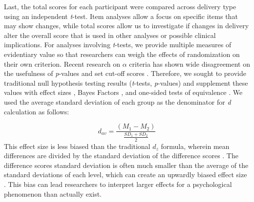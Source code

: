 \documentclass[english,man, mask]{apa6}
\theoremstyle{definition}
\theoremstyle{definition}
\theoremstyle{definition}
\theoremstyle{remark}
\begin{document}
Last, the total scores for each participant were compared across
delivery type using an independent \emph{t}-test. Item analyses allow a
focus on specific items that may show changes, while total scores allow
us to investigate if changes in delivery alter the overall score that is
used in other analyses or possible clinical implications. For analyses
involving \emph{t}-tests, we provide multiple measures of evidentiary
value so that researchers can weigh the effects of randomization on
their own criterion. Recent research on \(\alpha\) criteria has shown
wide disagreement on the usefulness of \emph{p}-values and set cut-off
scores \autocites{Benjamin2017}{Lakens2017}. Therefore, we sought to
provide traditional null hypothesis testing results (\emph{t}-tests,
\emph{p}-values) and supplement these values with effect sizes
\autocites[\emph{d} and non-central confidence
intervals,][]{Cumming2014}{Buchanan2017}{Smithson2001}, Bayes Factors
\autocites{Kass1995}{Morey2015b}, and one-sided tests of equivalence
\autocites[TOST,][]{Cribbie2004}{Lakens2017a}{Schuirmann1987}{Rogers1993}.
We used the average standard deviation of each group as the denominator
for \emph{d} calculation as follows:

\[
d_{av} = \frac {(M_1 -  M_2) } { \frac{SD_1 + SD_2 } {2} }
\] This effect size is less biased than the traditional \(d_z\) formula,
wherein mean differences are divided by the standard deviation of the
difference scores \autocite{Lakens2013}. The difference scores standard
deviation is often much smaller than the average of the standard
deviations of each level, which can create an upwardly biased effect
size \autocite{Cumming2014}. This bias can lead researchers to interpret
larger effects for a psychological phenomenon than actually exist.
\end{document}
